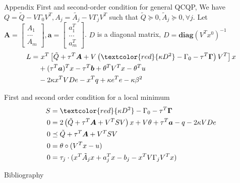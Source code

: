 \documentclass{beamerswitch}
\newcommand{\diag}{\textbf{diag}}
\newcommand{\red}[1]{\textcolor{red}{#1}}
\begin{document}
\begin{frame}[allowframebreaks]{Appendix}
  First and second-order condition for general QCQP,
  We have \(Q = \tilde{Q} - V\Gamma_0V^T, A_j = \tilde{A_j} - V\Gamma_j V^T\) such that \(\tilde{Q} \succeq 0, \tilde A_j \succeq 0, \forall j\). Let \(\bm A = \begin{bmatrix}    A_1 \\ ... \\ A_m  \end{bmatrix}, \bm a = \begin{bmatrix}
    a_1^T \\...\\a_m^T  \end{bmatrix}\). \(D\) is a diagonal matrix, \(D = \diag(V^Tx^0)^{-1} \)
  \begin{align*}
    L = & ~ x^T\left[\tilde Q + \tau^T \bm A + V\left (\red{\kappa D^2} - \Gamma_0 - \tau^T \bm \Gamma \right )V^T\right ]x \\
        & + (\tau^T\bm a)^T x- \tau^T \bm b + \theta^TV^Tx - \theta^Tu                                                      \\
        & - 2 \kappa x^T VDe - x^Tq + \kappa e^Te - \kappa \beta^2
  \end{align*}
  \framebreak

  First and second order condition for a local minimum
  \begin{align*}
    S & = \red{\kappa D^2} - \Gamma_0 - \tau^T \bm  \Gamma                                          \\
    0 & = 2\left(\tilde Q + \tau^T \bm A + V^TSV\right) x + V\theta + \tau^T\bm a - q - 2\kappa VDe \\
    0 & \preceq  \tilde Q + \tau^T \bm A + V^TSV                                                    \\
    0 & = \theta \circ (V^Tx-u)                                                                     \\
    0 & = \tau_j \cdot (x^T\tilde A_j x + a_j ^Tx - b_j - x^TV\Gamma_j V^Tx)
  \end{align*}
\end{frame}
\begin{frame}[allowframebreaks]{Bibliography}
  
  
\end{frame}
\end{document}

